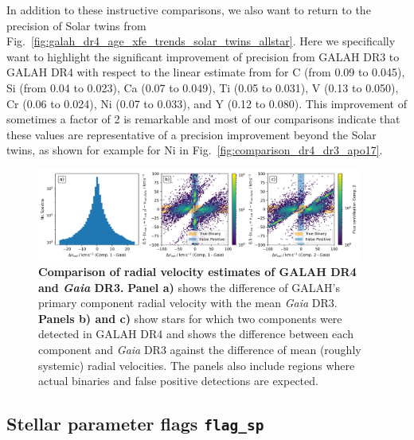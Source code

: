 \documentclass[
  journal=pasa,
  manuscript=research-paper, %
  year=2024,
  volume=37
]{cup-journal}
\begin{document}
In addition to these instructive comparisons, we also want to return to the precision of Solar twins from Fig.~\ref{fig:galah_dr4_age_xfe_trends_solar_twins_allstar}. Here we specifically want to highlight the significant improvement of precision from GALAH DR3 to GALAH DR4 with respect to the linear estimate from \citet{Bedell2018} for C (from 0.09 to 0.045), Si (from 0.04 to 0.023), Ca (0.07 to 0.049), Ti (0.05 to 0.031), V (0.13 to 0.050), Cr (0.06 to 0.024), Ni (0.07 to 0.033), and Y (0.12 to 0.080). This improvement of sometimes a factor of 2 is remarkable and most of our comparisons indicate that these values are representative of a precision improvement beyond the Solar twins, as shown for example for Ni in Fig.~\ref{fig:comparison_dr4_dr3_apo17}.

\begin{figure}[ht]
\centering
\includegraphics[width=0.95\textwidth]{figures/vrad_comparison_comp1_comp2_gaiadr3.png}
\caption{\textbf{Comparison of radial velocity estimates of GALAH DR4 and \textit{Gaia} DR3.} \textbf{Panel a)} shows the difference of GALAH's primary component radial velocity with the mean \textit{Gaia} DR3. \textbf{Panels b) and c)} show stars for which two components were detected in GALAH DR4 and shows the difference between each component and \textit{Gaia} DR3 against the difference of mean (roughly systemic) radial velocities. The panels also include regions where actual binaries and false positive detections are expected.}
\label{fig:vrad_comparison_comp1_comp2_gaiadr3}
\end{figure}

\subsection{Stellar parameter flags \texttt{flag\_sp}}
\label{sec:flag_sp}
\end{document}

